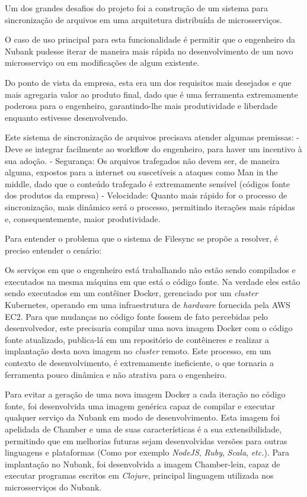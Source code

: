 \documentclass[twosideprint]{politex}
\begin{document}
	Um dos grandes desafios do projeto foi a construção de um sistema para sincronização de arquivos em uma arquitetura distribuída de microsserviços.
	
	O caso de uso principal para esta funcionalidade é permitir que o engenheiro da Nubank pudesse iterar de maneira mais rápida no desenvolvimento de um novo microsserviço ou em modificações de algum existente.
	
	Do ponto de vista da empresa, esta era um dos requisitos mais desejados e que mais agregaria valor ao produto final, dado que é uma ferramenta extremamente poderosa para o engenheiro, garantindo-lhe mais produtividade e liberdade enquanto estivesse desenvolvendo.
	
	Este sistema de sincronização de arquivos precisava atender algumas premissas:
	- Deve se integrar facilmente ao workflow do engenheiro, para haver um incentivo à sua adoção.
	- Segurança: Os arquivos trafegados não devem ser, de maneira alguma, expostos para a internet ou suscetíveis a ataques como Man in the middle, dado que o conteúdo trafegado é extremamente sensível (códigos fonte dos produtos da empresa)
	- Velocidade: Quanto mais rápido for o processo de sincronização, mais dinâmico será o processo, permitindo iterações mais rápidas e, consequentemente, maior produtividade.

	Para entender o problema que o sistema de Filesync se propõe a resolver, é preciso entender o cenário:
	
	Os serviços em que o engenheiro está trabalhando não estão sendo compilados e executados na mesma máquina em que está o código fonte. Na verdade eles estão sendo executados em um contêiner Docker, gerenciado por um \textit{cluster} Kubernetes, operando em uma infraestrutura de \textit{hardware} fornecida pela AWS EC2. Para que mudanças no código fonte fossem de fato percebidas pelo desenvolvedor, este precisaria compilar uma nova imagem Docker com o código fonte atualizado, publica-lá em um repositório de contêineres e realizar a implantação desta nova imagem no \textit{cluster} remoto. Este processo, em um contexto de desenvolvimento, é extremamente ineficiente, o que tornaria a ferramenta pouco dinâmica e não atrativa para o engenheiro.

	Para evitar a geração de uma nova imagem Docker a cada iteração no código fonte, foi desenvolvida uma imagem genérica capaz de compilar e executar qualquer serviço da Nubank em modo de desenvolvimento. Esta imagem foi apelidada de Chamber e uma de suas características é a sua extensibilidade, permitindo que em melhorias futuras sejam desenvolvidas versões para outras linguagens e plataformas (Como por exemplo \textit{NodeJS}, \textit{Ruby}, \textit{Scala}, \textit{etc.}). Para implantação no Nubank, foi desenvolvida a imagem Chamber-lein, capaz de executar programas escritos em \textit{Clojure}, principal linguagem utilizada nos microsserviços do Nubank.
	
\end{document}

